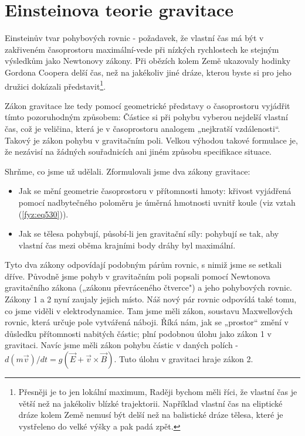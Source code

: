   \section{Einsteinova teorie gravitace}\label{fyz:IIchapXVLIIsecIX}
    Einsteinův tvar pohybových rovnic - požadavek, že vlastní čas má být v zakřiveném časoprostoru 
    maximální-vede při nízkých rychlostech ke stejným výsledkům jako Newtonovy zákony. Při obězích 
    kolem Země ukazovaly hodinky Gordona Coopera delší čas, než na jakékoliv jiné dráze, kterou 
    byste si pro jeho družici dokázali představit\footnote{Přesněji je to jen lokální maximum, 
    Raději bychom měli říci, že vlastní čas je větší než na jakékoliv blízké trajektorii. Například 
    vlastní čas na eliptické dráze kolem Země nemusí být delší než na balistické dráze tělesa, 
    které je vystřeleno do velké výšky a pak padá zpět.}.
    
    Zákon gravitace lze tedy pomocí geometrické představy o časoprostoru vyjádřit tímto 
    pozoruhodným způsobem: Částice si při pohybu vyberou nejdelší vlastní čas, což je veličina, 
    která je v časoprostoru analogem „nejkratší vzdálenosti“. Takový je zákon pohybu v gravitačním 
    poli. Velkou výhodou takové formulace je, že nezávisí na žádných souřadnicích ani jiném způsobu 
    specifikace situace.
    
    Shrňme, co jsme už udělali. Zformulovali jsme dva zákony gravitace:
    \begin{itemize}
      \item Jak se mění geometrie časoprostoru v přítomnosti hmoty: křivost vyjádřená pomocí 
            nadbytečného poloměru je úměrná hmotnosti uvnitř koule (viz vztah (\ref{fyz:eq530})).
      \item Jak se tělesa pohybují, působí-li jen gravitační síly: pohybují se tak, aby vlastní čas 
             mezi oběma krajními body dráhy byl maximální.
    \end{itemize}
    
    Tyto dva zákony odpovídají podobným párům rovnic, s nimiž jsme se setkali dříve. Původně jsme 
    pohyb v gravitačním poli popsali pomocí Newtonova gravitačního zákona („zákonu převráceného 
    čtverce") a jeho pohybových rovnic. Zákony \num{1} a \num{2} nyní zaujaly jejich místo. Náš 
    nový pár rovnic odpovídá také tomu, co jsme viděli v elektrodynamice. Tam jsme měli zákon, 
    soustavu Maxwellových rovnic, která určuje pole vytvářená náboji. Říká nám, jak se „prostor“ 
    změní v důsledku přítomnosti nabitých částic; plní podobnou úlohu jako zákon 1 v gravitaci. 
    Navíc jsme měli zákon pohybu částic v daných polích - \(d(m\vec{v})/dt = g(\vec{E} + 
    \vec{v}\times\vec{B})\). Tuto úlohu v gravitaci hraje zákon \num{2}.
    

